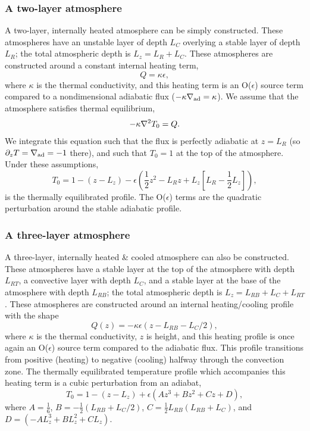\subsubsection{A two-layer atmosphere}
A two-layer, internally heated atmosphere can be simply constructed.
These atmospheres have an unstable layer of depth $L_C$ overlying a stable layer of depth $L_R$; the total atmospheric depth is $L_z = L_R + L_C$.
These atmospheres are constructed around a constant internal heating term,
\begin{equation}
Q = \kappa \epsilon,
\end{equation}
where $\kappa$ is the thermal conductivity, and this heating term is an O($\epsilon$) source term compared to a nondimensional adiabatic flux ($-\kappa\nabla_{\text{ad}} = \kappa$).
We assume that the atmosphere satisfies thermal equilibrium,
$$
-\kappa \nabla^2 T_0 = Q.
$$
We integrate this equation such that the flux is perfectly adiabatic at $z = L_R$ (so $\partial_z T = \nabla_{\text{ad}} = -1$ there), and such that $T_0 = 1$ at the top of the atmosphere.
Under these assumptions,
\begin{equation}
T_0 = 1 - (z - L_z) - \epsilon\left(\frac{1}{2} z^2 - L_R z + L_z \left[L_R - \frac{1}{2}L_z\right]\right),
\end{equation}
is the thermally equilibrated profile.
The O($\epsilon$) terms are the quadratic perturbation around the stable adiabatic profile.



\subsubsection{A three-layer atmosphere}
A three-layer, internally heated \& cooled atmosphere can also be constructed.
These atmospheres have a stable layer at the top of the atmosphere with depth $L_{RT}$, a convective layer with depth $L_C$, and a stable layer at the base of the atmosphere with depth $L_{RB}$; the total atmospheric depth is $L_z = L_{RB} + L_C + L_{RT}$.
These atmospheres are constructed around an internal heating/cooling profile with the shape
\begin{equation}
Q(z) = -\kappa \epsilon(z - L_{RB} - L_C/2),
\end{equation}
where $\kappa$ is the thermal conductivity, $z$ is height, and this heating profile is once again an O($\epsilon$) source term compared to the adiabatic flux.
This profile transitions from positive (heating) to negative (cooling) halfway through the convection zone.
The thermally equilibrated temperature profile which accompanies this heating term is a cubic perturbation from an adiabat,
\begin{equation}
T_0 = 1 - (z - L_z) + \epsilon(A z^3 + B z^2 + Cz + D),
\end{equation}
where $A = \frac{1}{6}$, $B = -\frac{1}{2}(L_{RB} + L_C/2)$, $C = \frac{1}{2}L_{RB}(L_{RB} + L_C)$, and $D = (-AL_z^3 + BL_z^2 + CL_z)$.

